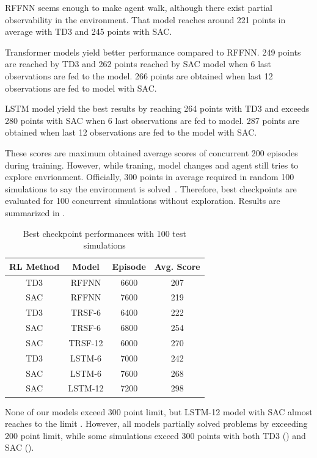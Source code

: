 RFFNN seems enough to make agent walk, although there exist partial observability in the environment. 
That model reaches around 221 points in average with TD3 and 245 points with SAC. 

Transformer models yield better performance compared to RFFNN. 249 points are reached by TD3 and 262 points reached by SAC model when 6 last observations are fed to the model. 266 points are obtained when last 12 observations are fed to model with SAC.

LSTM model yield the best results by reaching 264 points with TD3 and exceeds 280 points with SAC when 6 last observations are fed to model. 287 points are obtained when last 12 observations are fed to the model with SAC. 

These scores are maximum obtained average scores of concurrent 200 episodes during training. 
However, while traning, model changes and agent still tries to explore envrionment. 
Officially, 300 points in average required in random 100 simulations to say the environment is solved~\cite{noauthor_gymleaderboard_2021}.
Therefore, best checkpoints are evaluated for 100 concurrent simulations without exploration. 
Results are summarized in .

\begin{table}
\begin{center}
	\caption{Best checkpoint performances with 100 test simulations}
	\begin{tabular}{||c c c c||} 
		\hline
		RL Method & Model & Episode & Avg. Score \\ [0.5ex] 
		\hline\hline
		TD3 & RFFNN & 6600 & 207 \\ 
		\hline
		SAC & RFFNN & 7600 & 219 \\
		\hline
		TD3 & TRSF-6 & 6400 & 222 \\
		\hline
		SAC & TRSF-6 & 6800 & 254 \\
		\hline
		SAC & TRSF-12 & 6000 & 270 \\
		\hline
		TD3 & LSTM-6 & 7000 & 242 \\
		\hline
		SAC & LSTM-6 & 7600 & 268 \\
		\hline
		SAC & LSTM-12 & 7200 & 298 \\ [1ex] 
		\hline
	\end{tabular}
	\label{table:ckpt_performance}
\end{center}
\end{table}

None of our models exceed 300 point limit, but LSTM-12 model with SAC almost reaches to the limit . 
However, all models partially solved problems by exceeding 200 point limit, while some simulations exceed 300 points with both TD3 () and SAC (). 

